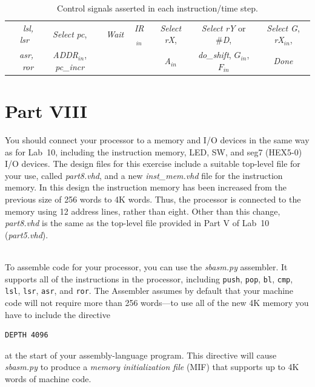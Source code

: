 \documentclass[epsfig,10pt,fullpage]{article} \addtolength{\textwidth}{1.5in}
\begin{document}
\begin{table}[H]
\begin{center}
\begin{tabular}{r|c|c|c|c|c|c|}
\cline{2-7}
\rule[-0.075in]{0in}{0.25in}{\it lsl, lsr~} & {\it Select} {\it pc}, &  {\it Wait} & {\it IR}$_{in}$ & {\it Select} {\it rX}, & {\it Select} {\it rY} or \#{\it D}, & {\it Select G}, {\it rX$_{in}$}, \\
{\it asr, ror} & {\it ADDR}$_{in}$, {\it pc\_incr} & {\it ~} & ~ & {\it A$_{in}$} & {\it do\_shift}, $G_{in}$, $F_{in}$ & {\it Done} \\
\cline{2-7}
\end{tabular}
\caption{Control signals asserted in each instruction/time step.}
\label{tab:control_signals}
\end{center}
\end{table}

\section*{Part VIII}

You should connect your processor to a memory and I/O devices in the same way as for
Lab~10, including the instruction memory, LED, SW, and seg7 (HEX5-0) I/O devices. 
The design files for this exercise include a suitable top-level file for your use, 
called {\it part8.vhd}, and a new {\it inst\_mem.vhd} file for the instruction memory. In 
this design the instruction memory has been increased from the previous size 
of 256 words to 4K words. Thus, the processor is
connected to the memory using 12 address lines, rather than eight. Other than this
change, {\it part8.vhd} is the same as the top-level file provided in Part V of Lab~10
({\it part5.vhd}).

~\\
\noindent
To assemble code for your processor, you can use the {\it sbasm.py}
assembler. It supports all of the instructions in the processor, 
including \texttt{push}, \texttt{pop}, \texttt{bl}, \texttt{cmp}, \texttt{lsl}, 
\texttt{lsr}, \texttt{asr}, and \texttt{ror}.
The Assembler assumes by default that your machine code will not require more than 
256 words---to use all of the new 4K memory you have to include the directive
\begin{verbatim}
DEPTH 4096
\end{verbatim}
at the start of your assembly-language program. This directive will cause 
{\it sbasm.py} to produce a
{\it memory initialization file} (MIF) that supports up to 4K words of machine code. 
\end{document}
